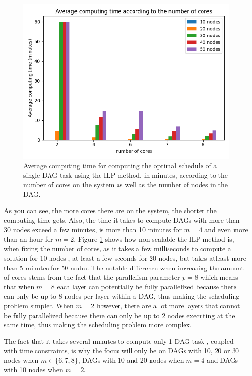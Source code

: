 \begin{figure}
    \centering
    \includegraphics[width=\linewidth]{images/result_computing_time_ilp.png}
    \caption{Average computing time for computing the optimal schedule
    of a single DAG task using the ILP method, in minutes, according to 
    the number of cores on the system as well as the number of nodes in the DAG.}
    \label{fig:ilp_compute_time}
\end{figure}

As you can see, the more cores there are on the system, 
the shorter the computing time gets.
Also, the time it takes to compute DAGs with more than 30 nodes
exceed a few minutes, is more than 10 minutes for $m=4$ and 
even more than an hour for $m=2$.
Figure \ref{fig:ilp_compute_time} shows how non-scalable
the ILP method is, when fixing the number of cores,
as it takes a few milliseconds to compute a solution for 10 nodes
, at least a few seconds for 20 nodes,
but takes atleast more than 5 minutes for 50 nodes.
The notable difference when increasing the amount of cores
stems from the fact that the parallelism parameter $p = 8$ which 
means that when  $m=8$ each layer can potentially be fully parallelized
because there can only be up to 8 nodes per layer within a DAG,
thus making the scheduling problem simpler.
When $m=2$ however, there are a lot more layers that cannot 
be fully parallelized because there can only be up to 2 nodes
executing at the same time, thus making the scheduling problem more complex.

The fact that it takes several minutes to compute only 1 DAG task 
, coupled with time constraints, is why 
the focus will only be on DAGs with 10, 20 or 30 nodes when $m \in \{6,7,8\}$,
DAGs with 10 and 20 nodes when $m=4$ and DAGs with 10 nodes when $m=2$.
